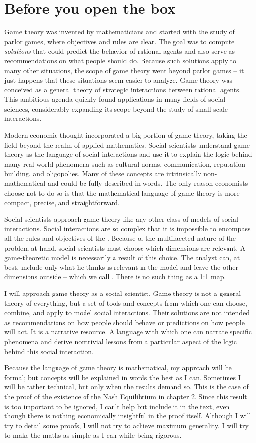 \documentclass[../main.tex]{subfiles}
\begin{document}
\section{Before you open the box}
Game theory was invented by mathematicians and started with the study of parlor games, where objectives and rules are clear. The goal was to compute \textit{solutions} that could predict the behavior of rational agents and also serve as recommendations on what people should do. Because such solutions apply to many other situations, the scope of game theory went beyond parlor games -- it just happens that these situations seem easier to analyze. Game theory was conceived as a general theory of strategic interactions between rational agents. This ambitious agenda quickly found applications in many fields of social sciences, considerably expanding its scope beyond the study of small-scale interactions. 

Modern economic thought incorporated a big portion of game theory, taking the field beyond the realm of applied mathematics. Social scientists understand game theory as the language of social interactions and use it to explain the logic behind many real-world phenomena such as cultural norms, communication, reputation building, and oligopolies. Many of these concepts are intrinsically non-mathematical and could be fully described in words. The only reason economists choose not to do so is that the mathematical language of game theory is more compact, precise, and straightforward.

Social scientists approach game theory like any other class of models of social interactions. Social interactions are so complex that it is impossible to encompass all the rules and objectives of the . Because of the multifaceted nature of the problem at hand, social scientists must choose which dimensions are relevant. A game-theoretic model is necessarily a result of this choice. The analyst can, at best, include only what he thinks is relevant in the model and leave the other dimensions outside -- which we call . There is no such thing as a 1:1 map.

I will approach game theory as a social scientist. Game theory is not a general theory of everything, but a set of tools and concepts from which one can choose, combine, and apply to model social interactions. Their solutions are not intended as recommendations on how people should behave or predictions on how people will act. It is a narrative resource. A language with which one can narrate specific phenomena and derive nontrivial lessons from a particular aspect of the logic behind this social interaction.

Because the language of game theory is mathematical, my approach will be formal; but concepts will be explained in words the best as I can. Sometimes I will be rather technical, but only when the results demand so. This is the case of the proof of the existence of the Nash Equilibrium in chapter 2. Since this result is too important to be ignored, I can't help but include it in the text, even though there is nothing economically insightful in the proof itself. Although I will try to detail some proofs, I will not try to achieve maximum generality. I will try to make the maths as simple as I can while being rigorous.
\end{document}
